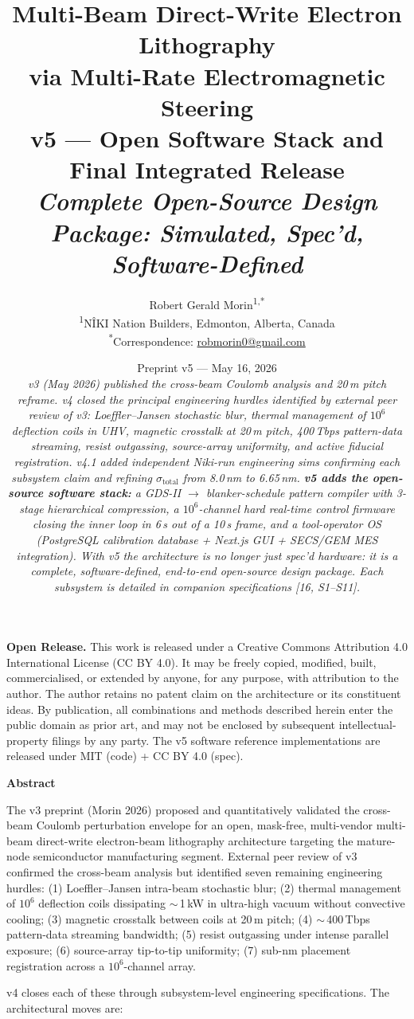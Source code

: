 \documentclass[11pt,letterpaper]{article}
\title{\Large \textbf{Multi-Beam Direct-Write Electron Lithography\\via Multi-Rate Electromagnetic Steering}\\[0.3em]
  \large v5 --- Open Software Stack and Final Integrated Release\\[0.2em]
  \normalsize \textit{Complete Open-Source Design Package: Simulated, Spec'd, Software-Defined}}
\author{Robert Gerald Morin\textsuperscript{1,*}\\[0.4em]
  {\small \textsuperscript{1}N\^{I}KI Nation Builders, Edmonton, Alberta, Canada}\\
  {\small \textsuperscript{*}Correspondence: \href{mailto:robmorin0@gmail.com}{robmorin0@gmail.com}}}
\date{Preprint v5 --- May 16, 2026\\[0.3em]
  {\small\textit{v3 (May 2026) published the cross-beam Coulomb analysis and 20\,\textmu m pitch reframe. v4 closed the principal engineering hurdles identified by external peer review of v3: Loeffler--Jansen stochastic blur, thermal management of $10^6$ deflection coils in UHV, magnetic crosstalk at 20\,\textmu m pitch, 400\,Tbps pattern-data streaming, resist outgassing, source-array uniformity, and active fiducial registration. v4.1 added independent Niki-run engineering sims confirming each subsystem claim and refining $\sigma_\text{total}$ from 8.0\,nm to 6.65\,nm. \textbf{v5 adds the open-source software stack:} a GDS-II $\to$ blanker-schedule pattern compiler with 3-stage hierarchical compression, a $10^6$-channel hard real-time control firmware closing the inner loop in 6\,\textmu s out of a 10\,\textmu s frame, and a tool-operator OS (PostgreSQL calibration database + Next.js GUI + SECS/GEM MES integration). With v5 the architecture is no longer just spec'd hardware: it is a complete, software-defined, end-to-end open-source design package. Each subsystem is detailed in companion specifications [16, S1--S11].}}}
\begin{document}
\maketitle
\thispagestyle{fancy}

\begin{mdframed}[linewidth=0.5pt,backgroundcolor=gray!4]
\textbf{Open Release.} This work is released under a Creative Commons Attribution 4.0 International License (CC BY 4.0). It may be freely copied, modified, built, commercialised, or extended by anyone, for any purpose, with attribution to the author. The author retains no patent claim on the architecture or its constituent ideas. By publication, all combinations and methods described herein enter the public domain as prior art, and may not be enclosed by subsequent intellectual-property filings by any party. The v5 software reference implementations are released under MIT (code) + CC BY 4.0 (spec).
\end{mdframed}

\begin{center}\textbf{Abstract}\end{center}
\noindent
The v3 preprint (Morin 2026) proposed and quantitatively validated the cross-beam Coulomb perturbation envelope for an open, mask-free, multi-vendor multi-beam direct-write electron-beam lithography architecture targeting the mature-node semiconductor manufacturing segment. External peer review of v3 confirmed the cross-beam analysis but identified seven remaining engineering hurdles: (1) Loeffler--Jansen intra-beam stochastic blur; (2) thermal management of $10^6$ deflection coils dissipating $\sim$\,1\,kW in ultra-high vacuum without convective cooling; (3) magnetic crosstalk between coils at 20\,\textmu m pitch; (4) $\sim$\,400\,Tbps pattern-data streaming bandwidth; (5) resist outgassing under intense parallel exposure; (6) source-array tip-to-tip uniformity; (7) sub-nm placement registration across a $10^6$-channel array.

v4 closes each of these through subsystem-level engineering specifications. The architectural moves are:
\end{document}
